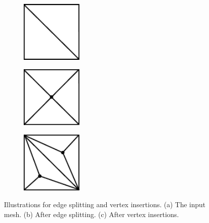 \begin{figure}[p]
\centering
\begin{subfigure}[c]{0.3\linewidth}
\centering
\includegraphics[height=3cm]{images/cutting-mig2015/basic_mesh.pdf}
\caption{\label{fig:basicMesh}}
\end{subfigure}
\hfill
\begin{subfigure}[c]{0.3\linewidth}
\centering
\includegraphics[height=3cm]{images/cutting-mig2015/edge_split.pdf}
\caption{\label{fig:edgeSplitting}}
\end{subfigure}
\hfill
\begin{subfigure}[c]{0.3\linewidth}
\centering
\includegraphics[height=3cm]{images/cutting-mig2015/vertex_insertion.pdf}
\caption{\label{fig:vertexInsertion}}
\end{subfigure}
\caption[Frame-based cutting: Edge splitting and vertex insertion]{\label{fig:operations} Illustrations for edge splitting and vertex insertions. (a) The input mesh. (b) After edge splitting. (c) After vertex insertions.}
\end{figure}

